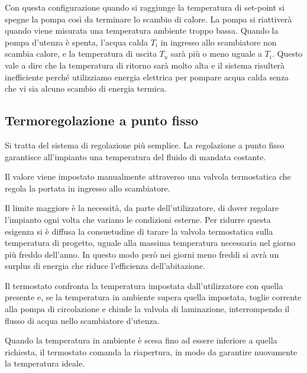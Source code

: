\documentclass[laurea,oneside,11pt]{USiena_tesiLM}
\begin{document}
Con questa configurazione quando si raggiunge la temperatura di set-point si spegne la pompa così da terminare lo scambio di calore. La pompa si riattiverà quando viene misurata una temperatura ambiente troppo bassa. Quando la pompa d'utenza è spenta, l'acqua calda $T_i$ in ingresso allo scambiatore non scambia calore, e la temperatura di uscita $T_u$ sarà più o meno uguale a $T_i$. Questo vale a dire che la temperatura di ritorno sarà molto alta e il sistema risulterà inefficiente perché utilizziamo energia elettrica per pompare acqua calda senza che vi sia alcuno scambio di energia termica.


\subsection{Termoregolazione a punto fisso}
Si tratta del sistema di regolazione più semplice. La regolazione a punto fisso garantisce all'impianto una temperatura del fluido di mandata costante. 

Il valore viene impostato manualmente attraverso una valvola termostatica che regola la portata in ingresso allo scambiatore.  

Il limite maggiore è la necessità, da parte dell'utilizzatore, di dover regolare l'impianto ogni volta che variano le condizioni esterne. Per ridurre questa esigenza si è diffusa la consuetudine di tarare la valvola termostatica sulla temperatura di progetto, uguale alla massima temperatura necessaria nel giorno più freddo dell'anno. In questo modo però nei giorni meno freddi si avrà un surplus di energia che riduce l'efficienza dell'abitazione.

Il termostato confronta la temperatura impostata dall'utilizzatore con quella presente e, se la temperatura in ambiente supera quella impostata, toglie corrente alla pompa di circolazione e chiude la valvola di laminazione, interrompendo il flusso di acqua nello scambiatore d'utenza. 

Quando la temperatura in ambiente è scesa fino ad essere inferiore a quella richiesta, il termostato comanda la riapertura, in modo da garantire nuovamente la temperatura ideale.
\end{document}
